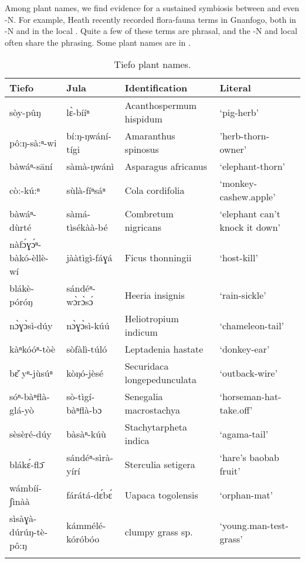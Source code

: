\documentclass[output=paper,
modfonts
]{langscibook}
\begin{document}
Among plant names, we find evidence for a sustained symbiosis between  and even -N. For example, Heath recently recorded flora-fauna terms in Gnanfogo, both in -N and in the local . Quite a few of these terms are phrasal, and the -N and local  often share the phrasing. Some plant names are in .

\begin{table}[t]
\caption{Tiefo plant names.}
\label{tab:hangtan:9}
\begin{tabularx}{\textwidth}{llQQ}
\lsptoprule
{\bfseries Tiefo} & {\bfseries Jula} & {\bfseries Identification} & {\bfseries Literal}\\
\midrule 
{ sòy-pûŋ} & { l{\`{ɛ}}{}-bííⁿ} & { Acanthospermum hispidum} & { ‘pig-herb’}\\
{ pô:ŋ-sà:ⁿ-wi} & { bí:ŋ-ŋwání-tígi} & { Amaranthus spinosus} & { ’herb-thorn-owner’}\\
{ bàwáⁿ-sāní} & { sàmà-ŋwánì} & { Asparagus africanus} & { ‘elephant-thorn’}\\
{ cò:-kú:ⁿ} & { sùlà-fíⁿsáⁿ} & { Cola cordifolia} & { ‘monkey-cashew.apple’}\\
{ bàwáⁿ-dùrté} & { sàmá-tìsékàà-bé} & { Combretum nigricans} & { ‘elephant can’t knock it down’}\\
{ nàf{\'{ɔ}}ɣ{\'{ɔ}}ⁿ{}-bàkó-èllè-wí} & { jààtìgì-fáɣá} & { Ficus thonningii} & { ‘host-kill’}\\
{ blákè-póróŋ} & { sándéⁿ-w{\`{ɔ}}r{\`{ɔ}}s{\'{ɔ}}} & { Heeria insignis} & { ‘rain-sickle’}\\
{ n{\`{ɔ}}ɣ{\`{ɔ}}sì-dúy} & { n{\`{ɔ}}ɣ{\`{ɔ}}sì-kúú} & { Heliotropium indicum} & { ‘chameleon-tail’}\\
{ kàⁿkóóⁿ-tòè} & { sòfàlì-túló} & { Leptadenia hastate} & { ‘donkey-ear’}\\
{ b{\v{ɛ}} yⁿ-jùsúⁿ} & { kòŋó-jèsé} & { Securidaca longepedunculata} & { ‘outback-wire’}\\
{ sóⁿ-bàⁿflà-glá-yò}  & { sò-tìgí-bàⁿflà-bɔ}  & { Senegalia macrostachya} & { ‘horseman-hat-take.off’}\\
{ sèsèré-dúy} & { bàsàⁿ-kúù} & { Stachytarpheta indica} &	{ ‘agama-tail’}\\
{ {blák}{\'{ɛ}}{{}-fl}\={ɔ}} & { sándéⁿ-sìrà-yírí} & { Sterculia setigera} & { ‘hare’s baobab fruit’}\\
{ wámbíí-ʃìnàà} & { fárátá-d{\'{ɛ}}b{\'{ɛ}}} & { Uapaca togolensis} & { ‘orphan-mat’}\\
{ sìsàɣà-dúrúŋ-tè-pô:ŋ} & { kámmélé-kóróbóo} & { clumpy grass sp.} & { ‘young.man-test-grass’}\\
\lspbottomrule
\end{tabularx}


\end{table}
\end{document}

